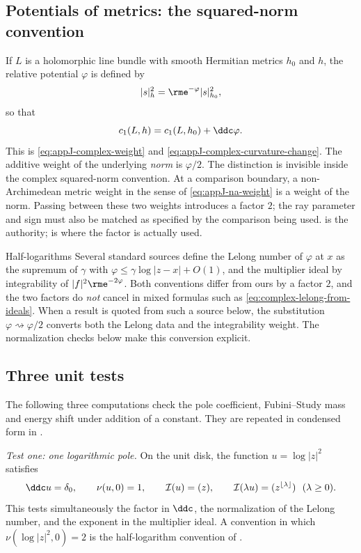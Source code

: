 \subsection{Potentials of metrics: the squared-norm convention}
\label{sec:ch51-squared-norm}

If $L$ is a holomorphic line bundle with smooth Hermitian metrics
$h_0$ and $h$, the relative potential $\varphi$ is defined by
\[
 |s|_h^2=\rme^{-\varphi}|s|_{h_0}^2 ,
\]
so that
\[
 c_1(L,h)=c_1(L,h_0)+\ddc\varphi .
\]
This is \eqref{eq:appJ-complex-weight} and
\eqref{eq:appJ-complex-curvature-change}.  The additive weight of the
underlying \emph{norm} is $\varphi/2$.  The distinction is invisible
inside the complex squared-norm convention.  At a comparison boundary,
a non-Archimedean metric weight in the sense of
\eqref{eq:appJ-na-weight} is a weight of the norm.  Passing between these
two weights introduces a factor $2$; the ray parameter and sign must also
be matched as specified by the comparison being used.
 is the
authority;  is where the factor is actually
used.

\begin{warning}{Half-logarithms}
\label{warn:ch51-half-log}
Several standard sources define the Lelong number of $\varphi$ at $x$
as the supremum of $\gamma$ with
$\varphi\leq\gamma\log|z-x|+O(1)$, and the multiplier ideal by
integrability of $|f|^2\rme^{-2\varphi}$.  Both conventions differ from
ours by a factor $2$, and the two factors do \emph{not} cancel in mixed
formulas such as \eqref{eq:complex-lelong-from-ideals}.  When a result is
quoted from such a source below, the substitution
$\varphi\rightsquigarrow\varphi/2$ converts both the Lelong data and the
integrability weight.  The
normalization checks below make this conversion explicit.
\end{warning}

\subsection{Three unit tests}
\label{sec:ch51-unit-tests}

The following three computations check the pole coefficient,
Fubini--Study mass and energy shift under addition of a constant.  They are
repeated in condensed form in .

\emph{Test one: one logarithmic pole.}  On the unit disk, the function
$u=\log|z|^2$ satisfies
\[
 \ddc u=\delta_0,\qquad \nu(u,0)=1,\qquad
 \mathcal I(u)=(z),\qquad \mathcal I(\lambda u)=(z^{\lfloor\lambda\rfloor})
 \ \ (\lambda\geq0).
\]
This tests simultaneously the factor in $\ddc$, the normalization of the
Lelong number, and the exponent in the multiplier ideal.  A convention in
which $\nu(\log|z|^2,0)=2$ is the half-logarithm convention of
.

